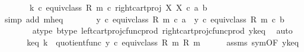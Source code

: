 \begin{isabellebody}
\ \ \ \ \ \ \ {\isacharparenleft}{\kern0pt}k\ {\isasymcirc}\isactrlsub c\ equiv{\isacharunderscore}{\kern0pt}class\ {\isacharparenleft}{\kern0pt}R{\isacharcomma}{\kern0pt}\ m{\isacharparenright}{\kern0pt}{\isacharparenright}{\kern0pt}\ {\isasymcirc}\isactrlsub c\ right{\isacharunderscore}{\kern0pt}cart{\isacharunderscore}{\kern0pt}proj\ X\ X\ {\isasymcirc}\isactrlsub c\ {\isasymlangle}a{\isacharcomma}{\kern0pt}\ b{\isasymrangle}{\isachardoublequoteclose}\isanewline
\ \ \ \ \ \ \isamarkupfalse%
\ {\isacharparenleft}{\kern0pt}simp\ add{\isacharcolon}{\kern0pt}\ m{\isacharunderscore}{\kern0pt}h{\isacharunderscore}{\kern0pt}eq{\isacharparenright}{\kern0pt}\isanewline
\ \ \ \ \isamarkupfalse%
\ \isamarkupfalse%
\ {\isachardoublequoteopen}{\isacharparenleft}{\kern0pt}y\ {\isasymcirc}\isactrlsub c\ equiv{\isacharunderscore}{\kern0pt}class\ {\isacharparenleft}{\kern0pt}R{\isacharcomma}{\kern0pt}\ m{\isacharparenright}{\kern0pt}{\isacharparenright}{\kern0pt}\ {\isasymcirc}\isactrlsub c\ a\ {\isacharequal}{\kern0pt}\ {\isacharparenleft}{\kern0pt}y\ {\isasymcirc}\isactrlsub c\ equiv{\isacharunderscore}{\kern0pt}class\ {\isacharparenleft}{\kern0pt}R{\isacharcomma}{\kern0pt}\ m{\isacharparenright}{\kern0pt}{\isacharparenright}{\kern0pt}\ {\isasymcirc}\isactrlsub c\ b{\isachardoublequoteclose}\isanewline
\ \ \ \ \ \ \isamarkupfalse%
\ a{\isacharunderscore}{\kern0pt}type\ b{\isacharunderscore}{\kern0pt}type\ left{\isacharunderscore}{\kern0pt}cart{\isacharunderscore}{\kern0pt}proj{\isacharunderscore}{\kern0pt}cfunc{\isacharunderscore}{\kern0pt}prod\ right{\isacharunderscore}{\kern0pt}cart{\isacharunderscore}{\kern0pt}proj{\isacharunderscore}{\kern0pt}cfunc{\isacharunderscore}{\kern0pt}prod\ y{\isacharunderscore}{\kern0pt}k{\isacharunderscore}{\kern0pt}eq\ \isamarkupfalse%
\ auto\isanewline
\ \ \isamarkupfalse%
\isanewline
\isanewline
\ \ \isamarkupfalse%
\ k{\isacharunderscore}{\kern0pt}eq{\isacharcolon}{\kern0pt}\ {\isachardoublequoteopen}k\ {\isacharequal}{\kern0pt}\ quotient{\isacharunderscore}{\kern0pt}func\ {\isacharparenleft}{\kern0pt}y\ {\isasymcirc}\isactrlsub c\ equiv{\isacharunderscore}{\kern0pt}class\ {\isacharparenleft}{\kern0pt}R{\isacharcomma}{\kern0pt}\ m{\isacharparenright}{\kern0pt}{\isacharparenright}{\kern0pt}\ {\isacharparenleft}{\kern0pt}R{\isacharcomma}{\kern0pt}\ m{\isacharparenright}{\kern0pt}{\isachardoublequoteclose}\isanewline
\ \ \ \ \isamarkupfalse%
\ assms\ sym{\isacharbrackleft}{\kern0pt}OF\ y{\isacharunderscore}{\kern0pt}k{\isacharunderscore}{\kern0pt}eq{\isacharbrackright}{\kern0pt}\isanewline

\end{isabellebody}
